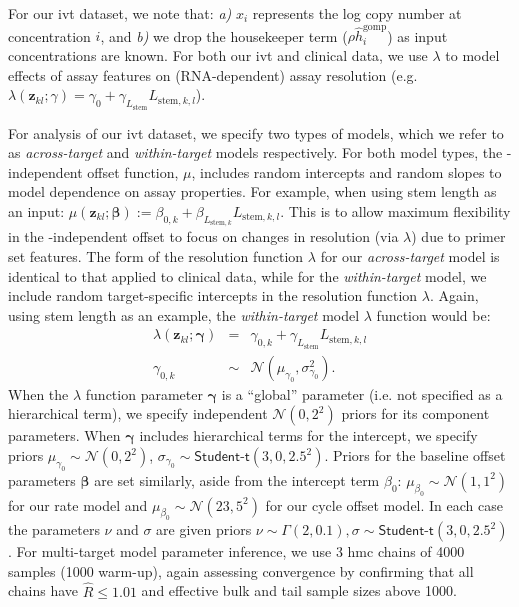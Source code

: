 \documentclass[../thesis.tex]{subfiles}
\begin{document}
For our \gls{ivt}  dataset, we note that: \emph{a)} $x_{i}$ represents the log  copy number at concentration $i$, and \emph{b)} we drop the housekeeper term ($\rho\hat{h}^{\text{gomp}}_{i}$) as input  concentrations are known. For both our \gls{ivt}   and clinical data, we use $\lambda$ to model effects of assay features on (RNA-dependent) assay resolution (e.g. $\lambda(\bm{z}_{kl}; \gamma) = \gamma_{0} + \gamma_{L_{\text{stem}}} L_{\text{stem},k,l}$).

For analysis of our \gls{ivt}  dataset, we specify two types of models, which we refer to as \emph{across-target} and \emph{within-target} models respectively. 
For both model types, the -independent offset function, $\mu$, includes random intercepts and random slopes to model dependence on assay properties. For example, when using stem length as an input: $\mu(\bm{z}_{kl}; \bm{\beta}) := \beta_{0,k} + \beta_{L_{\text{stem},k}} L_{\text{stem},k,l}$. This is to allow maximum flexibility in the -independent offset to focus on changes in resolution (via $\lambda$) due to primer set features.
The form of the resolution function $\lambda$ for our \emph{across-target} model is identical to that applied to clinical data, while for the \emph{within-target} model, we include random target-specific intercepts in the resolution function $\lambda$. Again, using stem length as an example, the \emph{within-target} model $\lambda$ function would be:
\begin{eqnarray}
\lambda(\bm{z}_{kl}; \bm{\gamma}) &=& \gamma_{0,k} + \gamma_{L_{\text{stem}}} L_{\text{stem},k,l} \\
\gamma_{0,k} &\sim&  \mathcal{N}(\mu_{\gamma_{0}}, \sigma^{2}_{\gamma_{0}}).    
\end{eqnarray}
When the $\lambda$ function parameter $\bm{\gamma}$ is a ``global'' parameter (i.e. not specified as a hierarchical term), we specify independent $\mathcal{N}(0,2^2)$ priors for its component parameters. When $\bm{\gamma}$ includes hierarchical terms for the intercept, we specify priors $\mu_{\gamma_{0}} \sim \mathcal{N}(0, 2^2)$, $\sigma_{\gamma_{0}} \sim \textsf{Student-t}(3, 0, 2.5^2)$. Priors for the baseline offset parameters $\bm{\beta}$ are set similarly, aside from the intercept term $\beta_0$: $\mu_{\beta_0} \sim \mathcal{N}(1, 1^2)$ for our rate model and $\mu_{\beta_0} \sim \mathcal{N}(23, 5^2)$ for our cycle offset model. In each case the parameters $\nu$ and $\sigma$ are given priors $\nu \sim \Gamma (2, 0.1), \sigma \sim \textsf{Student-t}(3, 0, 2.5^2)$.
For multi-target model parameter inference, we use 3 \gls{hmc} chains of 4000 samples (1000 warm-up), again assessing convergence by confirming that all chains have $\hat{R} \leq 1.01$ and effective bulk and tail sample sizes above 1000.
\end{document}
